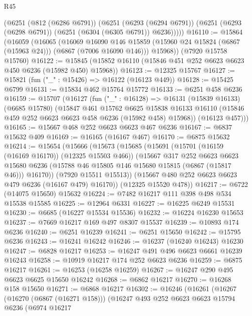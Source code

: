\begin{lexlean}{R45}
\begin{coremodule}
{      (@6251
        (@812 (@6286 @6791))
        (@6251
          (@6293 (@6294 @6791))
          (@6251 (@6293 (@6298 @6791)) (@6251 (@6304 (@6305 @6791)) @6236)))))
@16110 := @15864
    (@16059
      (@16065
        (@16069
          @16090
          @146
          @15859
          (@15960 @24 @15824 (@6867 (@15963 @24)))
          (@6867 (@7006 @16090 @146)))
        @15968))
    (@7920 @15758 @15760)
@16122 := @15845 (@15852 @16110 (@15846 @451 @252 @6623 @6623 @450 @6236 (@15982 @450) @15968))
@16123 := @12325 @15767
@16127 := @15821 (fun ("_" : @15426) => @16122 (@16123 @449))
@16128 := @15425 @6799
@16131 := @15834 @462 @15764 @15772
@16133 := @6251 @458 @6236
@16159 := @15707
    (@16127
      (fun ("_" : @16128) =>
      @16131
        (@15839 @16133)
        (@6685 @15780)
        (@15847
          @461
          @15762
          @6625
          @15838
          @16133
          @16110
          (@15846 @459 @252 @6623 @6623 @458 @6236 (@15982 @458) @15968))
        (@16123 @457)))
@16165 := @15667 @468 @252 @6623 @6623 @467 @6236
@16167 := @6837 @15632 @409
@16169 := @16165 (@16167 @467)
@16170 := @6875 @15632
@16214 := @15654
    (@15666
      (@15673
        (@15685
          (@15691
            (@15701 (@16159 (@16169 @16170)) (@12325 @15503 @466))
            (@15667
              @317
              @252
              @6623
              @6623
              @15680
              @6236
              (@15788 @46 @15805 @146 @15680 @15815 (@6867 (@15817 @46)))
              @16170))
          (@7920 @15511 @15513))
        (@15667 @480 @252 @6623 @6623 @479 @6236 (@16167 @479) @16170))
      (@12325 @15520 @478))
@16217 := @6722 (@14075 @15650) @15632
@16224 := @7482 @16217 @111 @398 @498 @534 @15538 @15585
@16225 := @12964 @6331
@16227 := @16225 @6249 @15531
@16230 := @6685 (@16227 @15534 @15536)
@16232 := @16224 @16230 @15653
@16237 := @7669 @16217 @169 @497 @8307 @15537
@16239 := @10893 @174 @6236
@16240 := @6251 @16239
@16241 := @6251 @15650
@16242 := @15795 @6236
@16243 := @16241 @16242
@16246 := @16237 (@16240 @16243) @16230
@16247 := @6828 @16217
@16253 := @16247 @491 @496 @6623 @6661 @16239 @16243
@16258 := @10919 @16217 @174 @252 @6623 @6236
@16259 := @6875 @16217
@16261 := @16253 (@16258 @16259)
@16267 := @16247 @290 @495 @6623 @6625 @15650 @16242
@16268 := @6862 @16217
@16270 := @16268 @158 @15650
@16271 := @6868 @16217
@16302 := @16246
    (@16261
      (@16267
        (@16270 (@6867 (@16271 @158)))
        (@16247
          @493
          @252
          @6623
          @6623
          @15794
          @6236
          (@6974
            @16217
}
\end{coremodule}
\end{lexlean}
